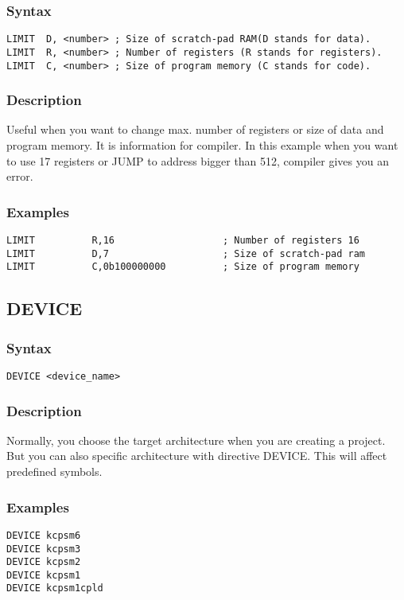         \subsubsection{Syntax}
            \verb'LIMIT  D, <number> ; Size of scratch-pad RAM(D stands for data).'\\
            \verb'LIMIT  R, <number> ; Number of registers (R stands for registers).'\\
            \verb'LIMIT  C, <number> ; Size of program memory (C stands for code).'\\

        \subsubsection{Description}
            Useful when you want to change max. number of registers or size of  data and program memory. It is information for compiler. In this example when you want to use 17 registers or JUMP to address bigger than 512, compiler gives you an error.

        \subsubsection{Examples}
            \verb'LIMIT          R,16                   ; Number of registers 16'\\
            \verb'LIMIT          D,7                    ; Size of scratch-pad ram   '\\
            \verb'LIMIT          C,0b100000000          ; Size of program memory '\\

    \subsection{DEVICE}
        \subsubsection{Syntax}
            \verb'DEVICE <device_name>'

        \subsubsection{Description}
            Normally, you choose the target architecture when you are creating a project. But you can also specific architecture with directive DEVICE. This will affect predefined symbols.

        \subsubsection{Examples}
            \verb'DEVICE kcpsm6'\\
            \verb'DEVICE kcpsm3'\\
            \verb'DEVICE kcpsm2'\\
            \verb'DEVICE kcpsm1'\\
            \verb'DEVICE kcpsm1cpld'

